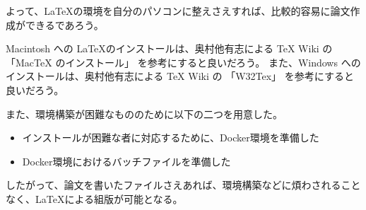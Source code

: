 よって、\LaTeX の環境を自分のパソコンに整えさえすれば、比較的容易に論文作成ができるであろう。

Macintosh への \LaTeX のインストールは、奥村他有志による TeX Wiki の 「MacTeX のインストール」\cite{mactex} を参考にすると良いだろう。
また、Windows へのインストールは、奥村他有志による TeX Wiki の 「W32Tex」\cite{w32tex} を参考にすると良いだろう。

また、環境構築が困難なもののために以下の二つを用意した。
\begin{itemize}
\item インストールが困難な者に対応するために、Docker環境を準備した
\item Docker環境におけるバッチファイルを準備した
\end{itemize}

したがって、論文を書いたファイルさえあれば、環境構築などに煩わされることなく、\LaTeX による組版が可能となる。%
%